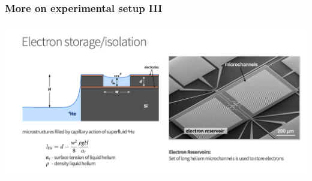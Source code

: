\documentclass{beamer}
\begin{document}
\begin{frame}
\frametitle{More on experimental setup III}

\vspace{6mm}

\centerline{\includegraphics[width=1.3\linewidth]{qcfigures/Elhelium3.png}}

\vspace{6mm}
\end{frame}
\end{document}

